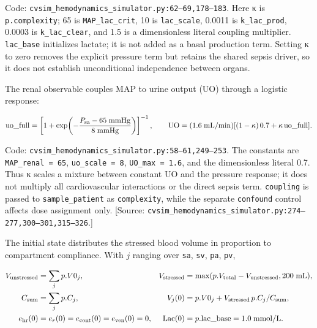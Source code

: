 Code: \texttt{cvsim\_\allowbreak{}hemodynamics\_\allowbreak{}simulator.\allowbreak{}py:\allowbreak{}62–\allowbreak{}69,\allowbreak{}178–\allowbreak{}183}. Here κ is \texttt{p.\allowbreak{}complexity}; 65 is \texttt{MAP\_\allowbreak{}lac\_\allowbreak{}crit}, 10 is \texttt{lac\_\allowbreak{}scale}, 0.0011 is \texttt{k\_\allowbreak{}lac\_\allowbreak{}prod}, 0.0003 is \texttt{k\_\allowbreak{}lac\_\allowbreak{}clear}, and 1.5 is a dimensionless literal coupling multiplier. \texttt{lac\_\allowbreak{}base} initializes lactate; it is not added as a basal production term. Setting κ to zero removes the explicit pressure term but retains the shared sepsis driver, so it does not establish unconditional independence between organs.

The renal observable couples MAP to urine output (UO) through a logistic response:

\[
\mathrm{uo\_full}=\left[1+\exp\!\left(-\frac{P_{\rm sa}-65\;\mathrm{mmHg}}{8\;\mathrm{mmHg}}\right)\right]^{-1},\qquad
\mathrm{UO}=(1.6\;\mathrm{mL/min})[(1-\kappa)\,0.7+\kappa\,\mathrm{uo\_full}].
\]


Code: \texttt{cvsim\_\allowbreak{}hemodynamics\_\allowbreak{}simulator.\allowbreak{}py:\allowbreak{}58–\allowbreak{}61,\allowbreak{}249–\allowbreak{}253}. The constants are \texttt{MAP\_\allowbreak{}renal =\allowbreak{} 65}, \texttt{uo\_\allowbreak{}scale =\allowbreak{} 8}, \texttt{UO\_\allowbreak{}max =\allowbreak{} 1.\allowbreak{}6}, and the dimensionless literal 0.7. Thus κ scales a mixture between constant UO and the pressure response; it does not multiply all cardiovascular interactions or the direct sepsis term. \texttt{coupling} is passed to \texttt{sample\_\allowbreak{}patient} as \texttt{complexity}, while the separate \texttt{confound} control affects dose assignment only. [Source: \texttt{cvsim\_\allowbreak{}hemodynamics\_\allowbreak{}simulator.\allowbreak{}py:\allowbreak{}274–\allowbreak{}277,\allowbreak{}300–\allowbreak{}301,\allowbreak{}315–\allowbreak{}326}.]

The initial state distributes the stressed blood volume in proportion to compartment compliance. With \(j\) ranging over \texttt{sa}, \texttt{sv}, \texttt{pa}, \texttt{pv},

\[
\begin{aligned}
V_{\rm unstressed}&=\sum_j p.V0_j,&
V_{\rm stressed}&=\max(p.V_{\rm total}-V_{\rm unstressed},200\;\mathrm{mL}),\\
C_{\rm sum}&=\sum_j p.C_j,&
V_j(0)&=p.V0_j+V_{\rm stressed}\,p.C_j/C_{\rm sum},\\
e_{\rm hr}(0)&=e_r(0)=e_{\rm cont}(0)=e_{\rm ven}(0)=0,&
\mathrm{Lac}(0)&=p.\mathrm{lac\_base}=1.0\;\mathrm{mmol/L}.
\end{aligned}
\]


